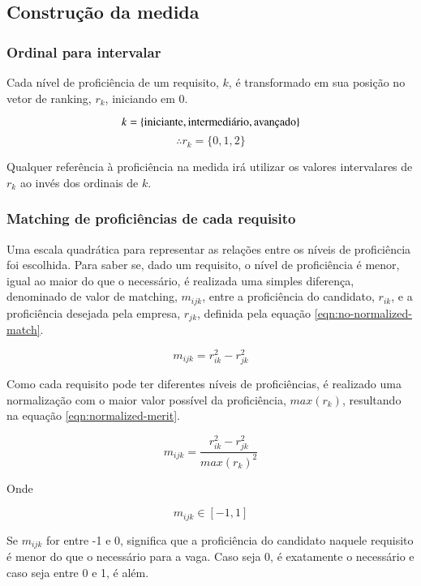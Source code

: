 \documentclass[preprint,12pt]{elsarticle}
\begin{document}
\subsection{Construção da medida}
\subsubsection{Ordinal para intervalar}
\label{sssec:ordinal-interval}
Cada nível de proficiência de um requisito, $k$, é transformado em sua posição no vetor de ranking, $r_k$, iniciando em 0.
    
$$\\k = \{ \text{iniciante}, \text{intermediário}, \text{avançado} \}$$ 
$$ \therefore r_k = \{ 0, 1, 2 \} $$

Qualquer referência à proficiência na medida irá utilizar os valores intervalares de $r_k$ ao invés dos ordinais de $k$.

\subsubsection{Matching de proficiências de cada requisito}
\label{sssec:matching}
Uma escala quadrática para representar as relações entre os níveis de proficiência foi escolhida. Para saber se, dado um requisito, o nível de proficiência é menor, igual ao maior do que o necessário, é realizada uma simples diferença, denominado de valor de matching, $m_{ijk}$, entre a proficiência do candidato, $r_{ik}$, e a proficiência desejada pela empresa, $r_{jk}$, definida pela equação \ref{eqn:no-normalized-match}.
    
\begin{equation}
\label{eqn:no-normalized-match}
   m_{ijk} = r_{ik}^2 - r_{jk}^2
\end{equation}

Como cada requisito pode ter diferentes níveis de proficiências, é realizado uma normalização com o maior valor possível da proficiência, $max(r_k)$, resultando na equação \ref{eqn:normalized-merit}.
    
\begin{equation}
\label{eqn:normalized-merit}
m_{ijk} = \frac{r_{ik}^2 - r_{jk}^2}{max(r_k)^2}
\end{equation}

Onde

\begin{equation}
m_{ijk} \in [-1, 1]
\end{equation}

Se $m_{ijk}$ for entre -1 e 0, significa que a proficiência do candidato naquele requisito é menor do que o necessário para a vaga. Caso seja 0, é exatamente o necessário e caso seja entre 0 e 1, é além.
\end{document}
